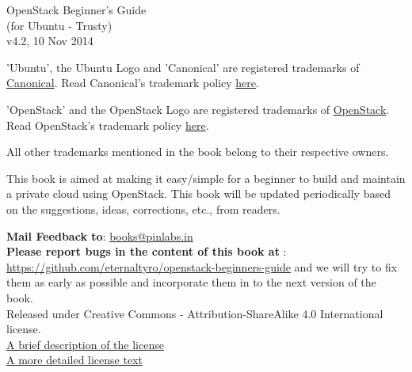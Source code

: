 \documentclass[10pt]{book}
\begin{document}
\pagebreak
\thispagestyle{empty}
\begin{flushleft}
\vspace{1in}
\begin{center}
{\huge OpenStack Beginner's Guide } 
\vspace{0.2cm}
{\Large \\(for Ubuntu - Trusty)}
\vspace{0.2cm}
{\large \\v4.2, 10 Nov 2014}

\vspace{0.05in}
\end{center}

\vspace{0.05in}

\vspace{1in}
'Ubuntu', the Ubuntu Logo and 'Canonical' are registered trademarks of  
\href{http://www.canonical.com/}{Canonical}. Read Canonical's trademark policy
\href{http://www.ubuntu.com/aboutus/trademarkpolicy}{here}.

\vspace{0.1in}
'OpenStack' and the OpenStack Logo are registered trademarks of  
\href{http://www.openstack.org/}{OpenStack}. Read OpenStack's trademark policy
\href{http://www.openstack.org/brand/openstack-trademark-policy/}{here}.

\vspace{0.1in}
All other trademarks mentioned in the book belong to their respective owners.


\vspace{0.1in}
This book is aimed at making it easy/simple for a beginner to build and maintain a private cloud using OpenStack. This book will be updated periodically based on the suggestions, ideas, corrections, etc., from readers. 

\vspace{0.1in}
\textbf{Mail Feedback to}: \href{mailto:books@pinlabs.in}{books@pinlabs.in} \\

\vspace{0.1in}
\textbf{Please report bugs in the content of this book at }: \href{https://github.com/eternaltyro/openstack-beginners-guide}{https://github.com/eternaltyro/openstack-beginners-guide} and we will try to fix them as early as possible and incorporate them in to the next version of the book.\\


\vspace{0.1in}
Released under Creative Commons - Attribution-ShareAlike 4.0 International license.\\
\vspace{0.1in}
\href{http://creativecommons.org/licenses/by-sa/4.0/}{A brief description of the license}\\
\vspace{0.1in}
\href{http://creativecommons.org/licenses/by-sa/4.0/legalcode}{A more detailed license text}

\end{flushleft} 
\vspace{0.5in}
\end{document}
